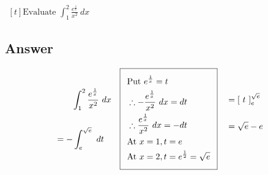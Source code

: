 \documentclass[17pt]{extarticle}
\begin{document}
\begin{fleqn}
$\begin{aligned}[t] 
\text{Evaluate \ } \int_{1}^{2} \frac{e^{\frac{1}{x}}}{x^2}\ dx
\end{aligned}$

\subsection*{Answer}
\begin{equation} \nonumber
\begin{alignedat}{4}
& \quad\quad  \int_{1}^{2} \frac{e^{\frac{1}{x}}}{x^2}\ dx\\
& \\
&= - \int_{e}^{\sqrt{e}}\ dt \\
\end{alignedat}
\quad 
\begin{alignedat}{4}
    \addtolength{\fboxsep}{5pt}
    \boxed{
     \begin{split}
       & \text{Put } e^{\frac{1}{x}}=t\\
       & \therefore - \frac{e^{\frac{1}{x}}}{x^2} \ dx =dt\\
        & \therefore \frac{e^{\frac{1}{x}}}{x^2} \ dx = -dt\\
         & \text{At } x= 1, t=e \\
         & \text{At } x= 2, t=e^{\frac{1}{2}} = \sqrt{e}\\
        \end{split}
     }\end{alignedat}
\quad
\begin{alignedat}{4}
&= \left[\ t \ \right]_{e}^{\sqrt{e}} \\
& \\
&= \sqrt{e} - e \\
&  \\
\end{alignedat}
\end{equation}

\end{fleqn}
\end{document}
